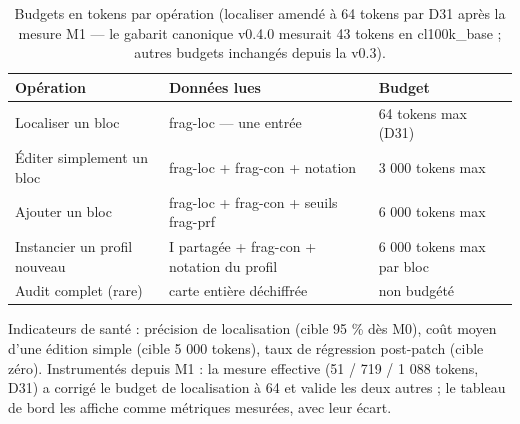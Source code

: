 \begin{table}[htbp]
\centering\small
\caption{Budgets en tokens par opération (localiser amendé à 64 tokens par D31 après la mesure M1 — le gabarit canonique v0.4.0 mesurait 43 tokens en cl100k\_base ; autres budgets inchangés depuis la v0.3).}
\label{tab:budgets}
\begin{tabularx}{\textwidth}{@{}Y Y l@{}}
\toprule
\textbf{Opération} & \textbf{Données lues} & \textbf{Budget} \\
\midrule
Localiser un bloc & frag-loc — une entrée & 64 tokens max (D31) \\
Éditer simplement un bloc & frag-loc + frag-con + notation & 3 000 tokens max \\
Ajouter un bloc & frag-loc + frag-con + seuils frag-prf & 6 000 tokens max \\
Instancier un profil nouveau & I partagée + frag-con + notation du profil & 6 000 tokens
max par bloc \\
Audit complet (rare) & carte entière déchiffrée & non budgété \\
\bottomrule
\end{tabularx}
\end{table}

Indicateurs de santé : précision de localisation (cible 95 \% dès M0), coût moyen d’une
édition simple (cible 5 000 tokens), taux de régression post-patch (cible zéro).
Instrumentés depuis M1 : la mesure effective (51 / 719 / 1 088 tokens, D31) a corrigé
le budget de localisation à 64 et valide les deux autres ; le tableau de bord les
affiche comme métriques mesurées, avec leur écart.
